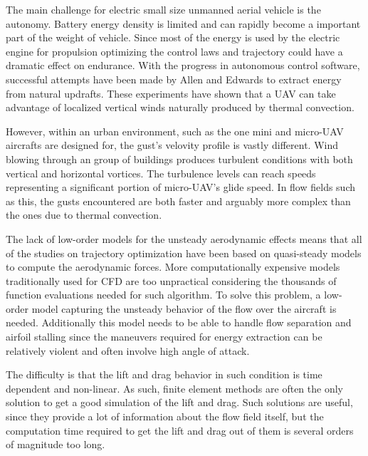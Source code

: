  \label{subsec:dynsoar}

The main challenge for electric small size unmanned aerial vehicle is the autonomy.
Battery energy density is limited and can rapidly become a important part of the weight of vehicle.
Since most of the energy is used by the electric engine for propulsion optimizing the control laws and trajectory could have a dramatic effect on endurance. 
With the progress in autonomous control software, successful attempts have been made by Allen \cite{flight_test_soaring_NASA} and Edwards \cite{flight_test_soaring_NCU} to extract energy from natural updrafts.
These experiments have shown that a UAV can take advantage of localized vertical winds naturally produced by thermal convection.

\par However, within an urban environment, such as the one mini and micro-UAV aircrafts are designed for, the gust's velovity profile is vastly different. 
Wind blowing through an group of buildings produces turbulent conditions with both vertical and horizontal vortices.
The turbulence levels can reach speeds representing a significant portion of micro-UAV's glide speed. 
In flow fields such as this, the gusts encountered are both faster and arguably more complex than the ones due to thermal convection.

\par The lack of low-order models for the unsteady aerodynamic effects means that all of the studies on trajectory optimization have been based on quasi-steady models to compute the aerodynamic forces.
More computationally expensive models traditionally used for CFD are too unpractical considering the thousands of function evaluations needed for such algorithm.
To solve this problem, a low-order model capturing the unsteady behavior of the flow over the aircraft is needed.
Additionally this model needs to be able to handle flow separation and airfoil stalling since the maneuvers required for energy extraction can be relatively violent and often involve high angle of attack.


The difficulty is that the lift and drag behavior in such condition is time dependent and non-linear.
As such, finite element methods are often the only solution to get a good simulation of the lift and drag.
Such solutions are useful, since they provide a lot of information about the flow field itself, but the computation time required to get the lift and drag out of them is several orders of magnitude too long.


